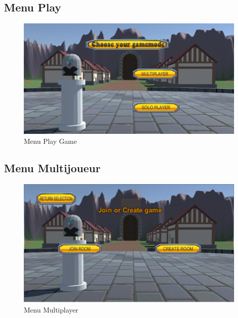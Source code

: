 \documentclass[a4paper]{article}
\begin{document}
	\clearpage
	
	\subsection{Menu Play}
	\begin{figure}[!ht]
		\centering
		\includegraphics[scale=0.3]{images/play.png}
		\caption{Menu Play Game}
	\end{figure}
	
	\subsection{Menu Multijoueur}
	\begin{figure}[!ht]
		\centering
		\includegraphics[scale=0.3]{images/multiplayer.png}
		\caption{Menu Multiplayer}
	\end{figure}

	\clearpage
	
\end{document}
